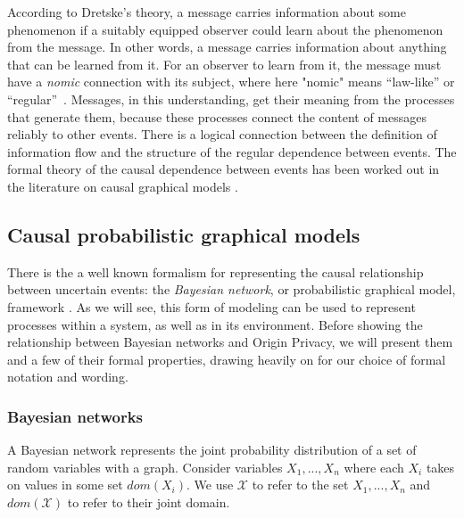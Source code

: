 \documentclass[../thesis.tex]{subfiles}
\begin{document}
According to Dretske's theory, a message
carries information about some phenomenon if a suitably equipped
observer could learn about the phenomenon from the message.
In other words, a message carries information about anything that
can be learned from it.
For an observer to learn from it, the message must have
a \emph{nomic} connection with its subject, where here "nomic" means
``law-like'' or ``regular''~\cite{dretske1981knowledge}.
Messages, in this understanding, get their meaning from the
processes that generate them, because these processes connect
the content of messages reliably to other events.
There is a logical connection between the definition of information
flow and the structure of the regular dependence between events.
The formal theory of the causal dependence between events has been
worked out in the literature on causal graphical 
models \cite{pearl1988probabilistic}.

\subsection{Causal probabilistic graphical models}
\label{sec:orgheadline18}

There is the a well known formalism for representing
the causal relationship between uncertain events: the
\emph{Bayesian network}, or probabilistic 
graphical model, framework \cite{pearl1988probabilistic}. 
As we will see, this form of modeling can be used to represent
processes within a system, as well as in its environment.
Before showing the relationship between Bayesian networks
and Origin Privacy, we will present them and a few of their
formal properties, drawing heavily on \citet{koller2003multi}
for our choice of formal notation and wording.

\subsubsection{Bayesian networks}
\label{sec:orgheadline16}

A Bayesian network represents the joint probability distribution
of a set of random variables with a graph. Consider variables
\(X_1, ..., X_n\) where each \(X_i\) takes on values in some set
\(dom(X_i)\). We use \(\mathcal{X}\) to refer to the set \(X_1, ..., X_n\)
and \(dom(\mathcal{X})\) to refer to their joint domain.
\end{document}
